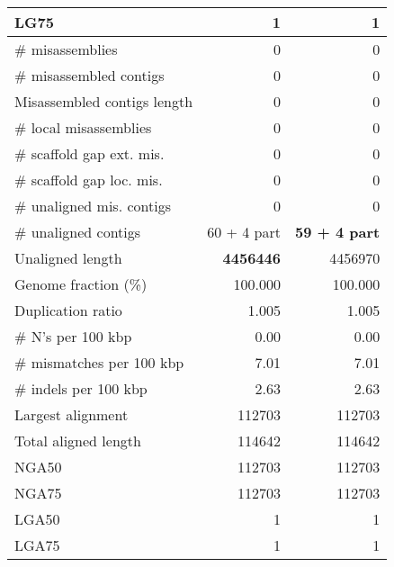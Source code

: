 \documentclass[12pt,a4paper]{article}
\begin{document}
\begin{table}[ht]
\begin{center}
\begin{tabular}{|l*{2}{|r}|}
LG75 & 1 & 1 \\ \hline
\# misassemblies & 0 & 0 \\ \hline
\# misassembled contigs & 0 & 0 \\ \hline
Misassembled contigs length & 0 & 0 \\ \hline
\# local misassemblies & 0 & 0 \\ \hline
\# scaffold gap ext. mis. & 0 & 0 \\ \hline
\# scaffold gap loc. mis. & 0 & 0 \\ \hline
\# unaligned mis. contigs & 0 & 0 \\ \hline
\# unaligned contigs & 60 + 4 part & {\bf 59 + 4 part} \\ \hline
Unaligned length & {\bf 4456446} & 4456970 \\ \hline
Genome fraction (\%) & 100.000 & 100.000 \\ \hline
Duplication ratio & 1.005 & 1.005 \\ \hline
\# N's per 100 kbp & 0.00 & 0.00 \\ \hline
\# mismatches per 100 kbp & 7.01 & 7.01 \\ \hline
\# indels per 100 kbp & 2.63 & 2.63 \\ \hline
Largest alignment & 112703 & 112703 \\ \hline
Total aligned length & 114642 & 114642 \\ \hline
NGA50 & 112703 & 112703 \\ \hline
NGA75 & 112703 & 112703 \\ \hline
LGA50 & 1 & 1 \\ \hline
LGA75 & 1 & 1 \\ \hline
\end{tabular}
\end{center}
\end{table}
\end{document}
